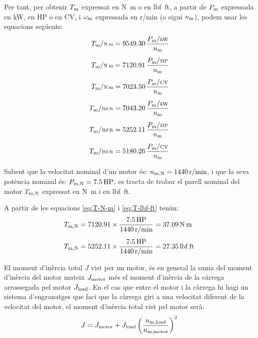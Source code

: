 Per tant, per  obtenir $T\ped{m}$ expressat en \si{N.m} o en \si{lbf.ft}, a partir de $P\ped{m}$ expressada en kW, en HP o en CV, i $\omega\ped{m}$ expressada en \si{r/min} (o sigui $n\ped{m}$),  podem usar les equacions següents:
\begin{subequations}
\begin{align}
    T\ped{m}/{\scriptstyle \si{N.m}} &= \num{9549,30}\,  \frac{P\ped{m}/{\scriptstyle \si{kW}}}{n\ped{m}} \\[1ex]
    T\ped{m}/{\scriptstyle \si{N.m}} &= \num{7120,91}\,  \frac{P\ped{m}/{\scriptstyle \si{HP}}}{n\ped{m}}\label{eq:T-N-m} \\[1ex]
    T\ped{m}/{\scriptstyle \si{N.m}} &= \num{7023,50}\,  \frac{P\ped{m}/{\scriptstyle \si{CV}}}{n\ped{m}} \\[1ex]
    T\ped{m}/{\scriptstyle \si{lbf.ft}} &= \num{7043,20}\,  \frac{P\ped{m}/{\scriptstyle \si{kW}}}{n\ped{m}} \\[1ex]
    T\ped{m}/{\scriptstyle \si{lbf.ft}} &= \num{5252,11}\,  \frac{P\ped{m}/{\scriptstyle \si{HP}}}{n\ped{m}}\label{eq:T-lbf-ft} \\[1ex]
    T\ped{m}/{\scriptstyle \si{lbf.ft}} &= \num{5180,26}\,  \frac{P\ped{m}/{\scriptstyle \si{CV}}}{n\ped{m}}
\end{align}
\end{subequations}

\begin{exemple}
    Sabent que la velocitat nominal d'un motor és: $n\ped{m,N} = \SI{1440}{r/min}$, i que la seva potència nominal és: $P\ped{m,N} = \SI{7,5}{HP}$,   es tracta de trobar el parell nominal del motor $T\ped{m,N}$ expressat en \si{N.m} i en \si{lbf.ft}.

    A partir de les equacions  \eqref{eq:T-N-m} i \eqref{eq:T-lbf-ft} tenim:
    \begin{align*}
      T\ped{m,N} &= \num{7120,91} \times \frac{\SI{7,5}{HP}}{\SI{1440}{r/min}} = \SI{37,09}{N.m} \\[1ex]
      T\ped{m,N} &= \num{5252,11} \times \frac{\SI{7,5}{HP}}{\SI{1440}{r/min}} = \SI{27,35}{lbf.ft}
    \end{align*}
\end{exemple}


El moment d'inèrcia total $J$ vist per un motor, és en general la suma del moment d'inèrcia del  motor mateix $J\ped{motor}$ més el moment d'inèrcia de la càrrega arrossegada pel motor $J\ped{load}$. En el cas que entre el motor i la càrrega hi hagi un sistema d'engranatges que faci que la càrrega giri a una velocitat diferent de la velocitat del motor, el  moment d'inèrcia total vist pel motor serà:
\begin{equation}\index{moment d'inèria}\index{J@$J$}
    J = J\ped{motor} +  J\ped{load}
    \left(\frac{n\ped{m,load}}{n\ped{m,motor}}\right)^2
\end{equation}

